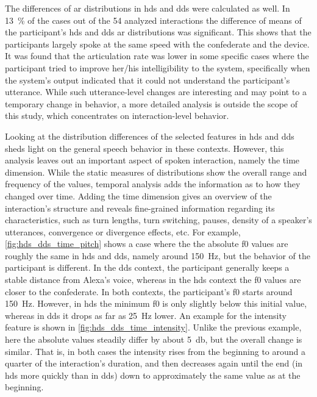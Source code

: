 The differences of \acf{ar} distributions in \ac{hds} and \ac{dds} were calculated as well.
In \SI{13}{\percent} of the cases out of the 54 analyzed interactions the difference of means of the participant's \ac{hds} and \ac{dds} \ac{ar} distributions was significant.
This shows that the participants largely spoke at the same speed with the confederate and the device.
It was found that the articulation rate was lower in some specific cases where the participant tried to improve her/his intelligibility to the system, specifically when the system's output indicated that it could not understand the participant's utterance.
While such utterance-level changes are interesting and may point to a temporary change in behavior, a more detailed analysis is outside the scope of this study, which concentrates on interaction-level behavior.

Looking at the distribution differences of the selected features in \ac{hds} and \ac{dds} sheds light on the general speech behavior in these contexts.
However, this analysis leaves out an important aspect of spoken interaction, namely the time dimension.
While the static measures of distributions show the overall range and frequency of the values, temporal analysis adds the information as to how they changed over time.
Adding the time dimension gives an overview of the interaction's structure and reveals fine-grained information regarding its characteristics, such as turn lengths, turn switching, pauses, density of a speaker's utterances, convergence or divergence effects, etc.
For example, \cref{fig:hds_dds_time_pitch} shows a case where the the absolute \ac{f0} values are roughly the same in \ac{hds} and \ac{dds}, namely around \SI{150}{\hertz}, but the behavior of the participant is different.
In the \ac{dds} context, the participant generally keeps a stable distance from Alexa's voice, whereas in the \ac{hds} context the \ac{f0} values are closer to the confederate.
In both contexts, the participant's \ac{f0} starts around \SI{150}{\hertz}.
However, in \ac{hds} the minimum \ac{f0} is only slightly below this initial value, whereas in \ac{dds} it drops as far as \SI{25}{\hertz} lower.
An example for the intensity feature is shown in \cref{fig:hds_dds_time_intensity}.
Unlike the previous example, here the absolute values steadily differ by about \SI{5}{\decibel}, but the overall change is similar.
That is, in both cases the intensity rises from the beginning to around a quarter of the interaction's duration, and then decreases again until the end (in \ac{hds} more quickly than in \ac{dds}) down to approximately the same value as at the beginning.

